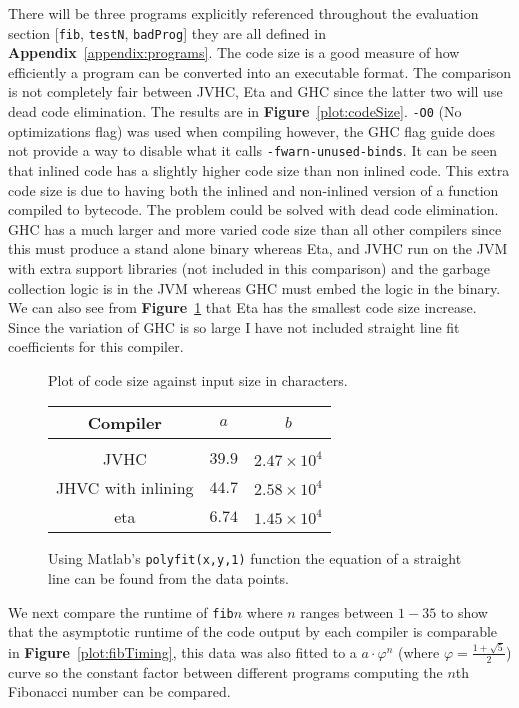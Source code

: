 \documentclass[float=false, crop=false]{standalone}
\newlength\gwidth
\newlength\gheight
\newcommand{\namefig}{\textbf{Figure}~}
\newcommand{\importMGraph}[3]{\setlength{\gwidth}{#2}\setlength{\gheight}{#3}{#1}}
\begin{document}
There will be three programs explicitly referenced throughout the evaluation section 
[\texttt{fib}, \texttt{testN}, \texttt{badProg}] they are all defined in 
\textbf{Appendix}~\ref{appendix:programs}.
The code size is a good measure of how efficiently a program can be converted
into an executable format. The comparison is not completely fair
between JVHC, Eta and GHC since the latter two will use dead code 
elimination. The results are in \namefig\ref{plot:codeSize}. \texttt{-O0} (No optimizations flag) 
was used when compiling however, the GHC flag guide \cite{haskell-flag-ref}
does not provide a way to disable what it calls \texttt{-fwarn-unused-binds}.
It can be seen that inlined code has a slightly higher code size than non inlined code.
This extra code size is due to having both the inlined and non-inlined version of a function compiled to
bytecode. The problem could be solved with dead code elimination. GHC has a much larger 
and more varied code size than all other compilers since this must produce a stand alone binary 
whereas Eta, and JVHC run on the JVM with extra support libraries (not included in this comparison) 
and the garbage collection logic is in the JVM whereas GHC must embed the logic in the binary. 
We can also see from \namefig\ref{table:codeSize}
that Eta has the smallest code size increase. Since the variation of GHC is so large I have not
included straight line fit coefficients for this compiler.


\begin{figure}
  \centering
  \importMGraph{plotCodeSize.tex}{0.90\textwidth}{0.4\textwidth}
  \caption[Plot of code size as a function of program input size in characters]{
    Plot of code size against input size in characters. 
    }
  \label{plot:codeSize}
  \begin{tabular}{ c | c c }
    Compiler& $a$ & $b$\\
    \hline\\
    JVHC & $39.9$ & $2.47 \times 10^{4}$ \\
    JHVC with inlining & $44.7$ & $2.58 \times 10^{4}$\\
    eta & $6.74$ & $1.45 \times 10^{4}$
  \end{tabular}
  \caption[Table of regression values for code size as a function of
  program size]{Using Matlab's \texttt{polyfit(x,y,1)} function 
    the equation of a straight line can be found from the data 
    points. }
  \label{table:codeSize}
\end{figure}

We next compare the runtime of \texttt{fib}$n$ where $n$ ranges between 
$1-35$ to show that the asymptotic runtime of the code output
by each compiler is comparable in \namefig\ref{plot:fibTiming}, this data was also fitted to a 
$a \cdot  \varphi^n$ (where $\varphi = \frac{1+\sqrt{5}}{2}$) curve so the  
constant factor between different programs computing
 the $n$th Fibonacci number can be compared. 
\end{document}
